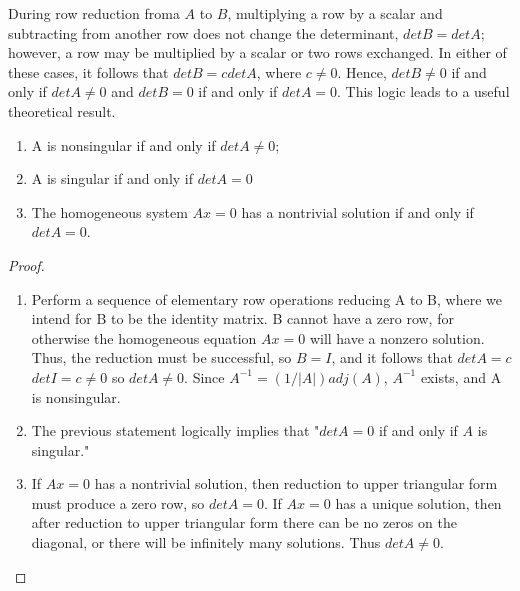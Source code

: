\documentclass[../main.tex]{subfiles}
\begin{document}
During row reduction froma \(A\) to \(B\), multiplying a row by a scalar and subtracting from another row does not change the determinant, \(det B = det A\); however, a row may be multiplied by a scalar or two rows exchanged. In either of these cases, it follows that \(det B = c det A\), where \(c\neq0\). Hence, \(det B \neq 0\) if and only if \(det A \neq 0\) and \(det B = 0\) if and only if \(det A = 0\). This logic leads to a useful theoretical result.

\begin{theorem} \label{th:4_5}
\leavevmode
  \begin{enumerate}[leftmargin = *]
    \item A is nonsingular if and only if \(det A \neq 0\);
    \item A is singular if and only if \(det A = 0\)
    \item The homogeneous system \(Ax = 0\) has a nontrivial solution if and only if \(det A = 0\).
  \end{enumerate}
\end{theorem}

\begin{proof}
\leavevmode
  \begin{enumerate}[leftmargin = *]
    \item Perform a sequence of elementary row operations reducing A to B, where we intend for B to be the identity matrix. B cannot have a zero row, for otherwise the homogeneous equation \(Ax = 0\) will have a nonzero solution. Thus, the reduction must be successful, so \(B = I\), and it follows that \(det A=c\) \(det I = c \neq 0\) so \(det A \neq 0\). Since \(A^{-1} = (1/|A|)adj(A)\), \(A^{-1}\) exists, and A is nonsingular.
    \item The previous statement logically implies that "\(det A =  0\) if and only if \(A\) is singular."
    \item If \(Ax = 0\) has a nontrivial solution, then reduction to upper triangular form must produce a zero row, so \(det A = 0\). If \(Ax = 0\) has a unique solution, then after reduction to upper triangular form there can be no zeros on the diagonal, or there will be infinitely many solutions. Thus \(det A \neq 0\).
  
  \end{enumerate}
\end{proof}
\end{document}
